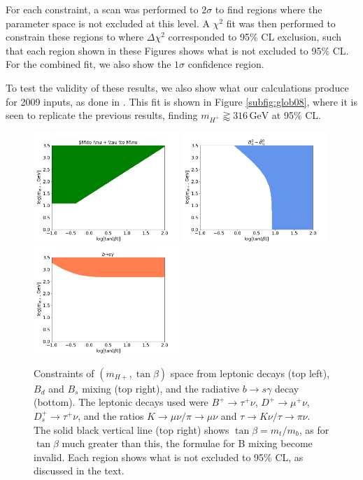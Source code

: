 \documentclass[a4paper,12pt]{article}
\begin{document}
For each constraint, a scan was performed to $2\sigma$ to find regions where the parameter space is not excluded at this level. 
A $\chi^2$ fit was then performed to constrain these regions to where $\Delta\chi^2$ corresponded to 95\% CL exclusion, such that each region shown in these Figures shows what is not excluded to 95\% CL.
For the combined fit, we also show the $1\sigma$ confidence region. 

To test the validity of these results, we also show what our calculations produce for 2009 inputs, as done in \cite{desc}.
This fit is shown in Figure \ref{subfig:glob08}, where it is seen to replicate the previous results, finding $m_{H^+} \gtrapprox 316\,\text{GeV}$ at 95\% CL.
\begin{figure}[ht]
    \vspace{-12pt}
    \centering
    \includegraphics[width=0.49\textwidth]{indy/leps.png}
    \includegraphics[width=0.49\textwidth]{indy/bmix.png}
    \includegraphics[width=0.49\textwidth]{indy/bsgamma.png}
    \caption{\label{fig:indies}Constraints of $(m_{H+},\tan\beta)$ space from leptonic decays (top left), $B_d$ and $B_s$ mixing (top right), and the radiative $b\to s\gamma$ decay (bottom). The leptonic decays used were $B^+\to\tau^+\nu$, $D^+\to\mu^+\nu$, $D_s^+\to\tau^+\nu$, and the ratios $K\to\mu\nu/\pi\to\mu\nu$ and $\tau\to K\nu/\tau\to\pi\nu$. 
        The solid black vertical line (top right) shows $\tan\beta=m_t/m_b$, as for $\tan\beta$ much greater than this, the formulae for B mixing become invalid. 
    Each region shows what is not excluded to 95\% CL, as discussed in the text.}
\end{figure}
\end{document}
